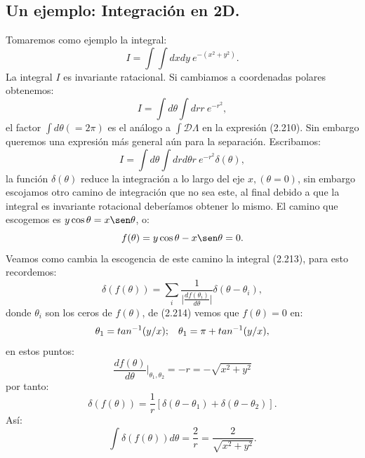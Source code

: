 \subsection{Un ejemplo: Integración en 2D.}
Tomaremos como ejemplo la integral:
\begin{equation}
I=\int \int dxdy\ e^{-(x^2+y^2)}.
\end{equation}
La integral $I$ es invariante ratacional. Si cambiamos a coordenadas polares obtenemos:
\begin{equation}
I=\int d\theta \int dr r\ e^{-r^2},
\end{equation}
el factor $\int d\theta(=2\pi)$ es el análogo a $\int\mathcal{D}\Lambda$ en la expresión (2.210). Sin embargo queremos una expresión más general aún para la separación. Escribamos:
\begin{equation}
I=\int d\theta \int drd\theta r\ e^{-r^2} \delta(\theta),
\end{equation}  
la función $\delta(\theta)$ reduce la integración a lo largo del eje $x, (\theta=0)$, sin embargo escojamos otro camino de integración que no sea este, al final debido a que la integral es invariante rotacional deberíamos obtener lo mismo. El camino que escogemos es $y\cos\theta=x\sen\theta$, o:
\begin{equation}
f(\theta)=y\cos\theta-x\sen\theta=0.
\end{equation}
Veamos como cambia la escogencia de este camino la integral (2.213), para esto recordemos:
\begin{equation}
\delta(f(\theta))=\sum_{i}\frac{1}{\bigg|\frac{df(\theta_{i})}{d\theta}\bigg|}\delta(\theta-\theta_{i}),
\end{equation}
donde $\theta_i$ son los ceros de $f(\theta)$, de (2.214) vemos que $f(\theta)=0$ en:
\begin{equation}
\theta_1=tan^{-1}(y/x); \hspace{0.3cm} \theta_1=\pi+tan^{-1}(y/x),
\end{equation} 
en estos puntos:
\begin{equation}
\frac{df(\theta)}{d\theta}\bigg|_{\theta_{1},\theta_{2}}=-r=-\sqrt{x^{2}+y^{2}}
\end{equation}
por tanto:
\begin{equation}
\delta(f(\theta))=\frac{1}{r}\left[\delta(\theta-\theta_{1})+\delta(\theta-\theta_{2})\right].
\end{equation}
Así:
\begin{equation}
\int\delta(f(\theta))d\theta=\frac{2}{r}=\frac{2}{\sqrt{x^{2}+y^{2}}}.
\end{equation}
